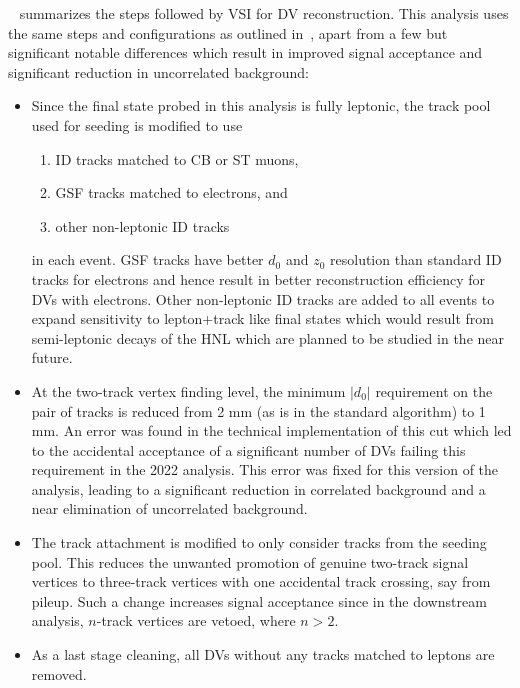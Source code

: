 ~ summarizes the steps followed by VSI for DV reconstruction. This analysis uses the same steps and configurations as outlined in~\cite{ATL-PHYS-PUB-2019-013}, apart from a few but significant notable differences which result in improved signal acceptance and significant reduction in uncorrelated background:
\begin{itemize}
    \item Since the final state probed in this analysis is fully leptonic, the track pool used for seeding is modified to use
    \begin{enumerate}
        \item ID tracks matched to CB or ST muons,
        \item GSF tracks matched to electrons, and
        \item other non-leptonic ID tracks
    \end{enumerate}
    in each event. GSF tracks have better $d_0$ and $z_0$ resolution than standard ID tracks for electrons and hence result in better reconstruction efficiency for DVs with electrons. Other non-leptonic ID tracks are added to all events to expand sensitivity to lepton+track like final states which would result from semi-leptonic decays of the HNL which are planned to be studied in the near future. 
    \item At the two-track vertex finding level, the minimum $|d_0|$ requirement on the pair of tracks is reduced from 2 mm (as is in the standard algorithm) to 1 mm. An error was found in the technical implementation of this cut which led to the accidental acceptance of a significant number of DVs failing this requirement in the 2022 analysis. This error was fixed for this version of the analysis, leading to a significant reduction in correlated background and a near elimination of uncorrelated background.
    \item The track attachment is modified to only consider tracks from the seeding pool. This reduces the unwanted promotion of genuine two-track signal vertices to three-track vertices with one accidental track crossing, say from pileup. Such a change increases signal acceptance since in the downstream analysis, $n$-track vertices are vetoed, where $n>2$.
    \item As a last stage cleaning, all DVs without any tracks matched to leptons are removed.
\end{itemize}

